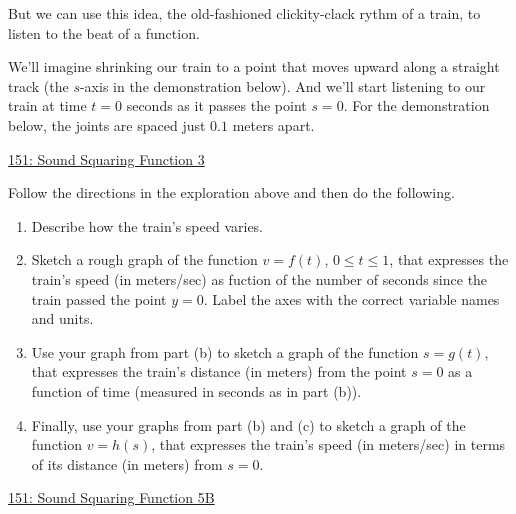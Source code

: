 \documentclass{ximera}
\begin{document}
\begin{exploration}  \label{EP9ppdfgdggt}

But we can use this idea, the old-fashioned clickity-clack rythm of a train, to listen to the beat of a function.

We'll imagine shrinking our train to a point that moves upward along a straight track (the $s$-axis in the demonstration below). And we'll start listening to our train at time $t=0$ seconds as it passes the point $s=0$. For the demonstration below, the joints are spaced just $0.1$ meters apart.

\begin{onlineOnly}
    \begin{center}
\end{center}
\end{onlineOnly}

\href{https://www.desmos.com/calculator/qjsfuvhsv9}{151: Sound Squaring Function 3}

Follow the directions in the exploration above and then do the following.

\begin{enumerate}
\item Describe how the train's speed varies.

\item Sketch a rough graph of the function $v=f(t)$, $0\leq t \leq 1$, that expresses the train's speed (in meters/sec) as fuction of the number of seconds since the train passed the point $y=0$. Label the axes with the correct variable names and units.

\item Use your graph from part (b) to sketch a graph of the function $s=g(t)$, that expresses the train's distance (in meters) from the point $s=0$ as a function of time (measured in seconds as in part (b)).

\item Finally, use your graphs from part (b) and (c) to sketch a graph of the function $v=h(s)$, that expresses the train's speed (in meters/sec) in terms of its distance (in meters) from $s=0$.  
\end{enumerate}

\begin{onlineOnly}
    \begin{center}
\end{center}
\end{onlineOnly}

\href{https://www.desmos.com/calculator/xaajoakuug}{151: Sound Squaring Function 5B}


\end{exploration}
\end{document}
